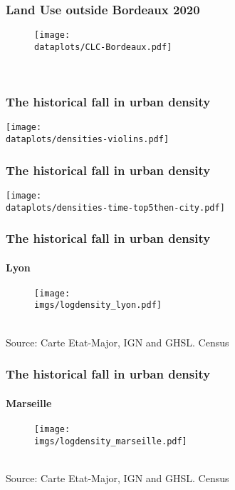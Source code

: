 \documentclass[aspectratio=169]{beamer}
\begin{document}
\begin{frame}[label=LandUseMeasureBordeaux]
	\frametitle{Land Use outside Bordeaux 2020}
	\begin{figure}
		\begin{center}
			\texttt{[image: \\dataplots/CLC-Bordeaux.pdf]}
		\end{center}
	\end{figure}
	\hspace{-1cm}
	\hyperlink{CLCmeasure}{}\\
\end{frame}

\begin{frame}[label=violins]
\frametitle{The historical fall in urban density}
	\begin{center}
		\texttt{[image: \\dataplots/densities-violins.pdf]}
	\end{center}
\hyperlink{density}{}
\end{frame}

\begin{frame}[label=Top5]
\frametitle{The historical fall in urban density}
	\begin{center}
		\texttt{[image: \\dataplots/densities-time-top5then-city.pdf]}
	\end{center}
\hyperlink{density}{}
\end{frame}

\begin{frame}[label=Lyon]
\frametitle{The historical fall in urban density}
\framesubtitle{Lyon}
\begin{figure}
	\begin{center}
		\texttt{[image: \\imgs/logdensity\_lyon.pdf]}
	\end{center}
\end{figure}
\hyperlink{density}{}\\
{\tiny Source: Carte Etat-Major, IGN and GHSL. Census}
\end{frame}

\begin{frame}[label=Marseille]
\frametitle{The historical fall in urban density}
\framesubtitle{Marseille}
\begin{figure}
	\begin{center}
		\texttt{[image: \\imgs/logdensity\_marseille.pdf]}
	\end{center}
\end{figure}
\hyperlink{density}{}\\
{\tiny Source: Carte Etat-Major, IGN and GHSL. Census}
\end{frame}
\end{document}
